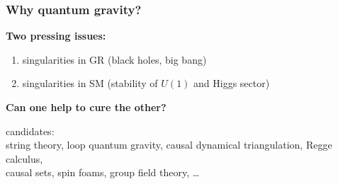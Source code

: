 \documentclass[]{beamer}  %
\begin{document}
\addtocounter{framenumber}{-1}
\begin{frame}
  \frametitle{Why quantum gravity?}
  \textbf{Two pressing issues:}
  \begin{enumerate}
    \item singularities in GR (black holes, big bang)
      \hspace{2cm}
    \item singularities in SM (stability of $U(1)$ and Higgs sector)
  \end{enumerate}
  \vfill
  \begin{center}
    \fontsize{12pt}{7.2}\selectfont
    \textbf{ Can one help to cure the other? }
  \end{center}
  \pause
  \begin{center}
    candidates:\\[5pt]
    string theory, loop quantum gravity, causal dynamical triangulation, Regge calculus,\\
    causal sets, spin foams, group field theory, \dots
  \end{center}
\end{frame}
\end{document}
